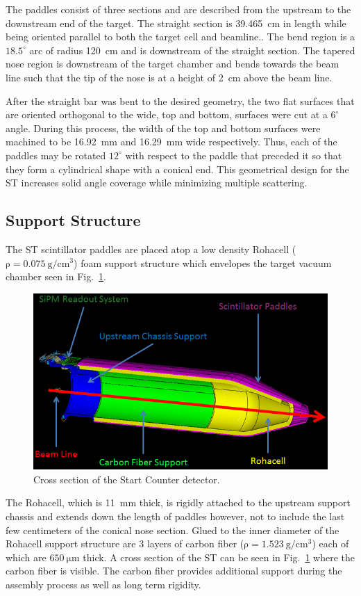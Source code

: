 The paddles consist of three sections and are described from the upstream to the downstream end of the target.  The straight section is 39.465~cm in length while being oriented parallel to both the target cell and beamline..  The bend region is a $18.5^{\circ}$ arc of radius 120~cm and is downstream of the straight section. The tapered nose region is downstream of the target chamber and bends towards the beam line such that the tip of the nose is at a height of 2~cm above the beam line.  

After the straight bar was bent to the desired geometry, the two flat surfaces that are oriented orthogonal to the wide, top and bottom, surfaces were cut at a $6^{\circ}$ angle.  During this process, the width of the top and bottom surfaces were machined to be 16.92~mm and 16.29~mm wide respectively.  Thus, each of the paddles may be rotated $12^{\circ}$ with respect to the paddle that preceded it so that they form a cylindrical shape with a conical end.  This geometrical design for the ST increases solid angle coverage while minimizing multiple scattering.  

\subsection{Support Structure}

The ST scintillator paddles are placed atop a low density Rohacell ($\mathrm{\rho = 0.075\ g/cm^{3}}$) foam support structure which envelopes the target vacuum chamber seen in Fig.~\ref{fig:ST_Cross_Section}.  
\begin{figure}[!htb]
	\centering
	\includegraphics[width=1.0\columnwidth]{design/figs/ST_Cross_Section}
	\caption[Cross section of the Start Counter detector]{Cross section of the Start Counter detector.}
	\label{fig:ST_Cross_Section}
\end{figure}
The Rohacell, which is 11~mm thick, is rigidly attached to the upstream support chassis and extends down the length of paddles however, not to include the last few centimeters of the conical nose section.  Glued to the inner diameter of the Rohacell support structure are 3 layers of carbon fiber ($\mathrm{\rho = 1.523\ g/cm^{3}}$) each of which are $\mathrm{650\ \mu m}$ thick.  A cross section of the ST can be seen in Fig.~\ref{fig:ST_Cross_Section} where the carbon fiber is visible.  The carbon fiber provides additional support during the assembly process as well as long term rigidity.  

